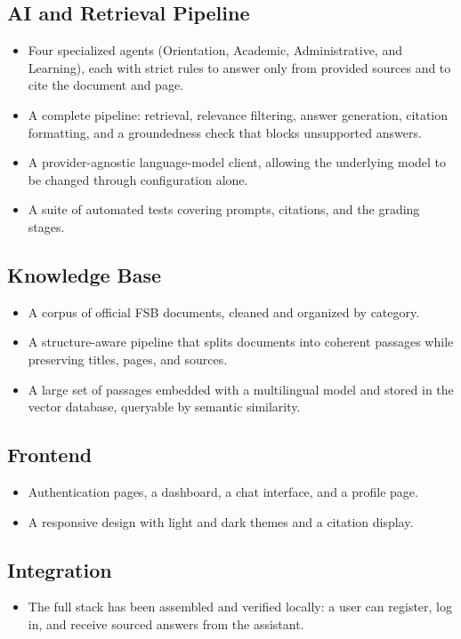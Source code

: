 \documentclass[11pt,a4paper]{article}
\begin{document}
\subsection{AI and Retrieval Pipeline}
\begin{itemize}
  \item Four specialized agents (Orientation, Academic, Administrative, and
        Learning), each with strict rules to answer only from provided sources and
        to cite the document and page.
  \item A complete pipeline: retrieval, relevance filtering, answer generation,
        citation formatting, and a groundedness check that blocks unsupported
        answers.
  \item A provider-agnostic language-model client, allowing the underlying model to
        be changed through configuration alone.
  \item A suite of automated tests covering prompts, citations, and the grading
        stages.
\end{itemize}

\subsection{Knowledge Base}
\begin{itemize}
  \item A corpus of official FSB documents, cleaned and organized by category.
  \item A structure-aware pipeline that splits documents into coherent passages
        while preserving titles, pages, and sources.
  \item A large set of passages embedded with a multilingual model and stored in the
        vector database, queryable by semantic similarity.
\end{itemize}

\subsection{Frontend}
\begin{itemize}
  \item Authentication pages, a dashboard, a chat interface, and a profile page.
  \item A responsive design with light and dark themes and a citation display.
\end{itemize}

\subsection{Integration}
\begin{itemize}
  \item The full stack has been assembled and verified locally: a user can register,
        log in, and receive sourced answers from the assistant.
\end{itemize}
\end{document}
